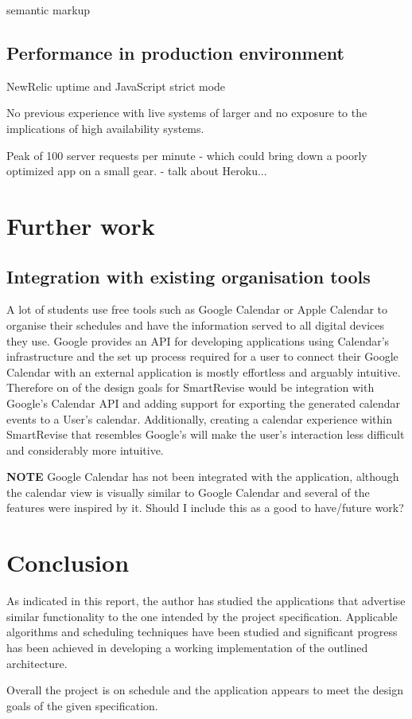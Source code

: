 \documentclass[bsc,frontabs,twoside,singlespacing,parskip]{infthesis}     %
\begin{document}
			semantic markup



	\section{Performance in production environment}\label{prod_eval}

		NewRelic uptime and JavaScript strict mode

		No previous experience with live systems of larger and no exposure to the implications of high availability systems.

		Peak of 100 server requests per minute - which could bring down a poorly optimized app on a small gear. - talk about Heroku...




\chapter{Further work}\label{further_work}

	\section{Integration with existing organisation tools}

		A lot of students use free tools such as Google Calendar or Apple Calendar to organise their schedules and have the information served to all digital devices they use. Google provides an API for developing applications using Calendar's infrastructure and the set up process required for a user to connect their Google Calendar with an external application is mostly effortless and arguably intuitive. Therefore on of the design goals for SmartRevise would be integration with Google's Calendar API and adding support for exporting the generated calendar events to a User's calendar. Additionally, creating a calendar experience within SmartRevise that resembles Google's will make the user's interaction less difficult and considerably more intuitive.

		\textbf{NOTE} Google Calendar has not been integrated with the application, although the calendar view is visually similar to Google Calendar and several of the features were inspired by it. Should I include this as a good to have/future work?




\chapter{Conclusion}

	As indicated in this report, the author has studied the applications that advertise similar functionality to the one intended by the project specification. Applicable algorithms and scheduling techniques have been studied and significant progress has been achieved in developing a working implementation of the outlined architecture.

	Overall the project is on schedule and the application appears to meet the design goals of the given specification.



%
%
\end{document}
